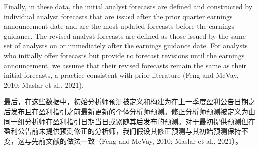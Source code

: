\documentclass[12pt,a4paper]{article}
\newenvironment{original}
  {\par\medskip\noindent\ignorespaces}
  {\par\medskip}
\newenvironment{translation}
  {\par\noindent{\color{transblue}\ignorespaces}}
  {\par\bigskip}
\begin{document}
\begin{original}
Finally, in these data, the initial analyst forecasts are defined and constructed by individual analyst forecasts that are issued after the prior quarter earnings announcement date and are the most updated forecasts before the earnings guidance. The revised analyst forecasts are defined as those issued by the same set of analysts on or immediately after the earnings guidance date. For analysts who initially offer forecasts but provide no forecast revisions until the earnings announcement, we assume that their revised forecasts remain the same as their initial forecasts, a practice consistent with prior literature (Feng and McVay, 2010; Maslar et al., 2021).
\end{original}
\begin{translation}
最后，在这些数据中，初始分析师预测被定义和构建为在上一季度盈利公告日期之后发布且在盈利指引之前最新更新的个体分析师预测。修正分析师预测被定义为由同一组分析师在盈利指引日期当日或紧随其后发布的预测。对于最初提供预测但在盈利公告前未提供预测修正的分析师，我们假设其修正预测与其初始预测保持不变，这与先前文献的做法一致（Feng and McVay, 2010; Maslar et al., 2021）。
\end{translation}
\end{document}
